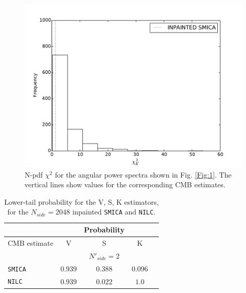 \begin{figure}
\includegraphics[scale=0.3]{figures/chapter-vsk/kchi2.pdf}
\caption{N-pdf $\chi^ 2$ for the angular power spectra shown in Fig. \ref{Fig:1}. The vertical lines show values for the corresponding CMB estimates.}
\label{Fig:2}
\end{figure}

\begin{table}
\centering
\caption{Lower-tail probability for the V, S, K estimators, for the $N_{side} = 2048$ inpainted \texttt{SMICA} and \texttt{NILC}.}
\label{table:1}
\begin{tabular}{@{}lcccc}
\hline 
  & & Probability & \\
\hline  
CMB estimate & V & S & K \\ 
\hline  
 & & $N'_{side}=2$ & \\
\texttt{SMICA} & $0.939$ & $0.388$ & $0.096$ \\ 
\texttt{NILC} & $0.939$ & $0.022$ & $1.0$  \\
\hline
\end{tabular} 
\end{table}

